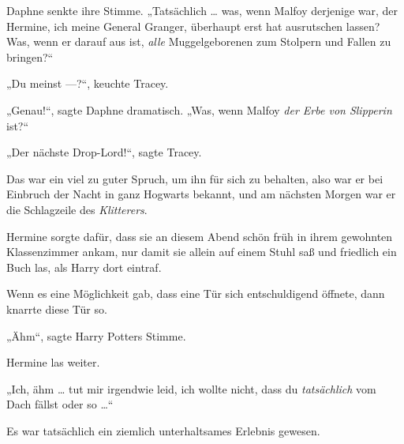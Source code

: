 Daphne senkte ihre Stimme. „Tatsächlich … was, wenn Malfoy derjenige war, der Hermine, ich meine General Granger, überhaupt erst hat ausrutschen lassen? Was, wenn er darauf aus ist, \emph{alle} Muggelgeborenen zum Stolpern und Fallen zu bringen?“

„Du meinst —?“, keuchte Tracey.

„Genau!“, sagte Daphne dramatisch. „Was, wenn Malfoy \emph{der Erbe von Slipperin} ist?“

„Der nächste Drop-Lord!“, sagte Tracey.

Das war ein viel zu guter Spruch, um ihn für sich zu behalten, also war er bei Einbruch der Nacht in ganz Hogwarts bekannt, und am nächsten Morgen war er die Schlagzeile des \emph{Klitterers}.


Hermine sorgte dafür, dass sie an diesem Abend schön früh in ihrem gewohnten Klassenzimmer ankam, nur damit sie allein auf einem Stuhl saß und friedlich ein Buch las, als Harry dort eintraf.

Wenn es eine Möglichkeit gab, dass eine Tür sich entschuldigend öffnete, dann knarrte diese Tür so.

„Ähm“, sagte Harry Potters Stimme.

Hermine las weiter.

„Ich, ähm … tut mir irgendwie leid, ich wollte nicht, dass du \emph{tatsächlich} vom Dach fällst oder so …“

Es war tatsächlich ein ziemlich unterhaltsames Erlebnis gewesen.

